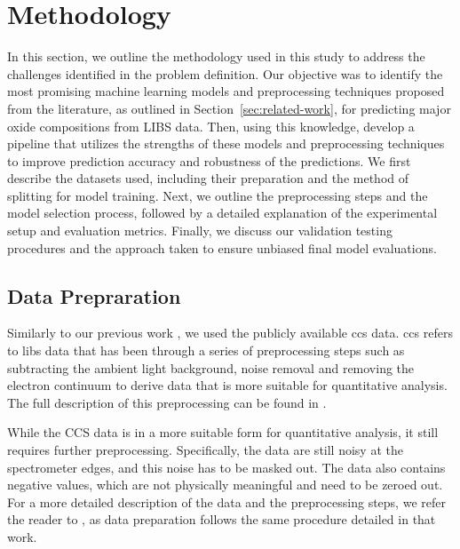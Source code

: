 \section{Methodology}\label{sec:methodology}
In this section, we outline the methodology used in this study to address the challenges identified in the problem definition. Our objective was to identify the most promising machine learning models and preprocessing techniques proposed from the literature, as outlined in Section~\ref{sec:related-work}, for predicting major oxide compositions from LIBS data. 
Then, using this knowledge, develop a pipeline that utilizes the strengths of these models and preprocessing techniques to improve prediction accuracy and robustness of the predictions.
We first describe the datasets used, including their preparation and the method of splitting for model training. Next, we outline the preprocessing steps and the model selection process, followed by a detailed explanation of the experimental setup and evaluation metrics. Finally, we discuss our validation testing procedures and the approach taken to ensure unbiased final model evaluations.

\subsection{Data Prepraration}
Similarly to our previous work \cite{p9_paper}, we used the publicly available \gls{ccs} data. 
\gls{ccs} refers to \gls{libs} data that has been through a series of preprocessing steps such as subtracting the ambient light background, noise removal and removing the electron continuum to derive data that is more suitable for quantitative analysis. 
The full description of this preprocessing can be found in \citet{wiensPreFlight3}.

While the CCS data is in a more suitable form for quantitative analysis, it still requires further preprocessing. Specifically, the data are still noisy at the spectrometer edges, and this noise has to be masked out. The data also contains negative values, which are not physically meaningful and need to be zeroed out.
For a more detailed description of the data and the preprocessing steps, we refer the reader to \citet{p9_paper}, as data preparation follows the same procedure detailed in that work.

